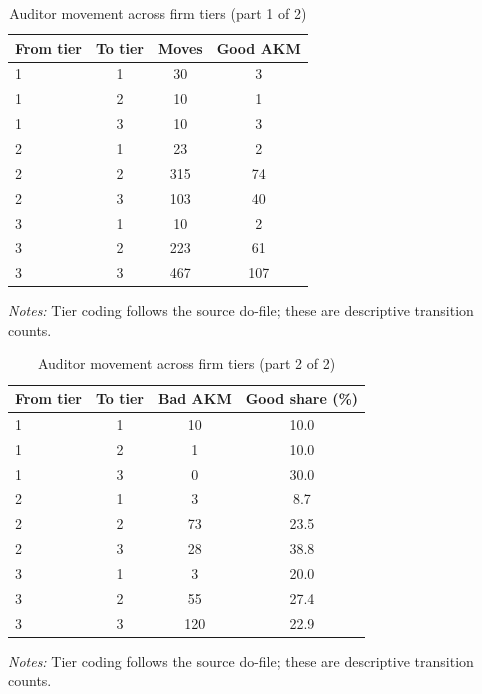 \begin{table}[htbp]
\footnotesize
\centering
\caption{Auditor movement across firm tiers (part 1 of 2)}
\begin{threeparttable}
\begin{tabular}{p{}ccc}
\toprule
From tier & To tier & Moves & Good AKM \\
\midrule
1 & 1 & 30 & 3 \\
1 & 2 & 10 & 1 \\
1 & 3 & 10 & 3 \\
2 & 1 & 23 & 2 \\
2 & 2 & 315 & 74 \\
2 & 3 & 103 & 40 \\
3 & 1 & 10 & 2 \\
3 & 2 & 223 & 61 \\
3 & 3 & 467 & 107 \\
\bottomrule
\end{tabular}
\begin{tablenotes}\footnotesize
\item \raggedright \textit{Notes:} Tier coding follows the source do-file; these are descriptive transition counts.
\end{tablenotes}
\end{threeparttable}
\end{table}

\begin{table}[htbp]
\footnotesize
\centering
\caption{Auditor movement across firm tiers (part 2 of 2)}
\begin{threeparttable}
\begin{tabular}{p{}ccc}
\toprule
From tier & To tier & Bad AKM & Good share (\%) \\
\midrule
1 & 1 & 10 & 10.0 \\
1 & 2 & 1 & 10.0 \\
1 & 3 & 0 & 30.0 \\
2 & 1 & 3 & 8.7 \\
2 & 2 & 73 & 23.5 \\
2 & 3 & 28 & 38.8 \\
3 & 1 & 3 & 20.0 \\
3 & 2 & 55 & 27.4 \\
3 & 3 & 120 & 22.9 \\
\bottomrule
\end{tabular}
\begin{tablenotes}\footnotesize
\item \raggedright \textit{Notes:} Tier coding follows the source do-file; these are descriptive transition counts.
\end{tablenotes}
\end{threeparttable}
\end{table}
